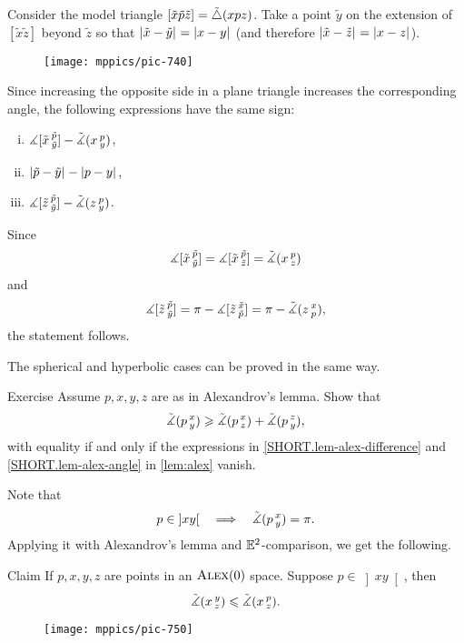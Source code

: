 Consider the model triangle $[\tilde x\tilde p\tilde z]=\tilde\triangle(x p z)$.
Take 
a point $\tilde y$ on the extension of 
$[\tilde x \tilde z]$ beyond $\tilde z$ so that $|{\tilde x}-{\tilde y}|_{}^{{}}=|{x}-{y}|_{}^{{}}$ (and therefore $|{\tilde x}-{\tilde z}|_{}^{{}}=|{x}-{z}|_{}^{{}}$). 

\begin{wrapfigure}{r}{33mm}
\vskip-8mm
\centering
\texttt{[image: mppics/pic-740]}
\end{wrapfigure}

Since increasing the opposite side in a plane triangle increases the corresponding angle, 
the following expressions have the same sign:
\begin{enumerate}[(i)]
\item $\measuredangle[\tilde x\,{}^{\tilde p}_{\tilde y}]-\tilde\measuredangle(x\,{}^{p}_{y})$,
\item $|{\tilde p}-{\tilde y}|_{}^{{}}-|{p}-{y}|_{}^{{}}$,
\item $\measuredangle[\tilde z\,{}^{\tilde p}_{\tilde y}]-\tilde\measuredangle(z\,{}^{p}_{y})$.
\end{enumerate}
Since 
\[\measuredangle[\tilde x\,{}^{\tilde p}_{\tilde y}]=\measuredangle[\tilde x\,{}^{\tilde p}_{\tilde z}]=\tilde\measuredangle(x\,{}^{p}_{z})\]
and
\[ \measuredangle[\tilde z\,{}^{\tilde p}_{\tilde y}]
=\pi-\measuredangle[\tilde z\,{}^{\tilde x}_{\tilde p}]
=\pi-\tilde\measuredangle(z\,{}^{x}_{p}),\]
the statement follows.


The spherical and hyperbolic cases can be proved in the same way.
\qeds

\begin{thm}{Exercise}\label{ex:alex-lemma-cat}
Assume $p,x,y,z$ are as in Alexandrov's lemma.
Show that
\[\tilde\measuredangle(p\,{}^{x}_{y})
\geqslant
\tilde\measuredangle(p\,{}^{x}_{z}) + \tilde\measuredangle(p\,{}^{z}_{y}),\]
with equality if and only if the expressions in \ref{SHORT.lem-alex-difference} and \ref{SHORT.lem-alex-angle} in \ref{lem:alex} vanish.
\end{thm}

Note that 
\[p\in\left]x y\right[
\quad\Longrightarrow\quad
\tilde\measuredangle(p\,{}^{x}_{y})=\pi.
\]
Applying it with Alexandrov's lemma and $\mathbb{E}^2$-comparison, we get the following.

\begin{thm}{Claim}\label{clm:angle-mono}
If $p,x,y,z$ are points in an $\textsc{Alex}(0)$ space.
Suppose $p\in\left]x y\right[$, then 
\[\tilde\measuredangle(x\,{}^{y}_{z})\leqslant \tilde\measuredangle(x\,{}^{p}_{z}).\]
\end{thm}

\begin{wrapfigure}{r}{25mm}
\vskip-0mm
\centering
\texttt{[image: mppics/pic-750]}
\end{wrapfigure}


